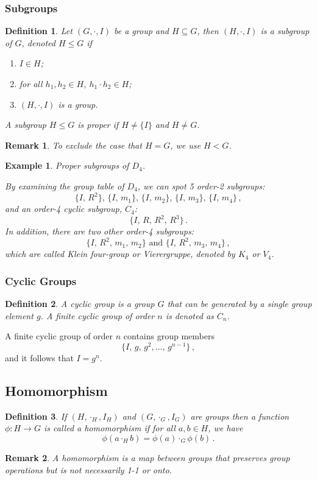 \documentclass{article}
\theoremstyle{plain}\theoremheaderfont{\normalfont\itshape}\theorembodyfont{\rmfamily}\theoremseparator{.}\newtheorem*{rem}{Remark}\newtheorem*{ex}{Example}\newtheorem*{proof}{Proof}\newtheorem*{altp}{Alternative proof}
\theoremstyle{plain}\theoremheaderfont{\normalfont\bfseries}\theorembodyfont{\rmfamily}\theoremseparator{.}\newtheorem{thm}{Theorem}[section]\newtheorem{lem}[thm]{Lemma}\newtheorem{prop}[thm]{Proposition}\newtheorem*{cor}{Corollary}\newtheorem{defn}[thm]{Definition}\newtheorem{clm}[thm]{Claim}\newtheorem{clminproof}{Claim}
\theoremstyle{break}\theoremheaderfont{\normalfont\itshape}\theorembodyfont{\rmfamily}\theoremseparator{.\medskip}\newtheorem*{proofskip}{Proof}\newtheorem*{exs}{Examples}\newtheorem*{rems}{Remarks}
\theoremstyle{break}\theoremheaderfont{\normalfont\bfseries}\theorembodyfont{\rmfamily}\theoremseparator{.\medskip}\newtheorem{lemskip}[thm]{Lemma}\newtheorem{defnskip}[thm]{Definition}\newtheorem{propskip}[thm]{Proposition}\newtheorem{thmskip}[thm]{Theorem}
\numberwithin{equation}{section}
\begin{document}
	\subsubsection{Subgroups}
	\begin{defn}
		Let \((G,\cdot,I)\) be a group and \(H\subseteq G\), then \((H,\cdot,I)\) is a \textit{subgroup} of \(G\), denoted \(H\le G\) if
		\begin{enumerate}[topsep=0pt]
			\item[(i)] \(I\in H\);
			\item[(ii)] for all \(h_1,h_2\in H\), \(h_1\cdot h_2\in H\);
			\item[(iii)] \((H,\cdot,I)\) is a group.
		\end{enumerate}
		A subgroup \(H\le G\) is \textit{proper} if \(H\ne\{I\}\) and \(H\ne G\). 
	\end{defn}
	\begin{rem}
		To exclude the case that \(H=G\), we use \(H<G\).
	\end{rem}
	\begin{ex}
		\textit{Proper subgroups of \(D_4\).}
		
		By examining the group table of \(D_4\), we can spot 5 order-2 subgroups:
		\[\{I,\, R^2\},\, \{I,\, m_1\},\, \{I,\, m_2\},\, \{I,\, m_3\},\, \{I,\, m_4\}\,, \]
		and an order-4 cyclic subgroup, \(C_4\):
		\[\{I,\, R,\, R^2,\, R^3\}\,.\]
		In addition, there are two other order-4 subgroups:
		\[\{I,\, R^2,\, m_1,\, m_2\}\text{ and } \{I,\, R^2,\, m_3,\, m_4\}\,,\]
		which are called \textit{Klein four-group} or \textit{Vierergruppe}, denoted by \(K_4\) or \(V_4\).
	\end{ex}
	\subsubsection{Cyclic Groups}
	\begin{defn}
		A \textit{cyclic group} is a group \(G\) that can be generated by a single group element \(g\). A finite cyclic group of order \(n\) is denoted as \(C_n\).
	\end{defn}
	A finite cyclic group of order \(n\) contains group members
	\[\{I,\, g,\, g^2,\dots,\, g^{n-1}\}\,,\]
	and it follows that \(I=g^n\).
	\subsection{Homomorphism}
	\begin{defn}
		If \((H,\cdot_H,I_H)\) and \((G,\cdot_G,I_G)\) are groups then a function \(\phi : H \to G\) is called a \textit{homomorphism} if for all \(a,b\in H\), we have
		\[\phi(a\cdot_H b)=\phi(a)\cdot_G\phi(b)\,.\]
	\end{defn}
	\begin{rem}
		A homomorphism is a map between groups that preserves group operations but is not necessarily 1-1 or onto.
	\end{rem}
\end{document}
